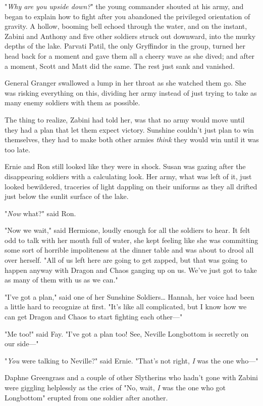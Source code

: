 "\emph{Why are you upside down?}" the young commander shouted at his army, and 
began to explain how to fight after you abandoned the privileged orientation of 
gravity.
\sbreak
A hollow, booming bell echoed through the water, and on the instant, Zabini and 
Anthony and five other soldiers struck out downward, into the murky depths of 
the lake. Parvati Patil, the only Gryffindor in the group, turned her head back 
for a moment and gave them all a cheery wave as she dived; and after a moment, 
Scott and Matt did the same. The rest just sank and vanished.

General Granger swallowed a lump in her throat as she watched them go. She was 
risking everything on this, dividing her army instead of just trying to take as 
many enemy soldiers with them as possible.

The thing to realize, Zabini had told her, was that no army would move until 
they had a plan that let them expect victory. Sunshine couldn't just plan to 
win themselves, they had to make both other armies \emph{think} they would win 
until it was too late.

Ernie and Ron still looked like they were in shock. Susan was gazing after the 
disappearing soldiers with a calculating look. Her army, what was left of it, 
just looked bewildered, traceries of light dappling on their uniforms as they 
all drifted just below the sunlit surface of the lake.

"\emph{Now} what?" said Ron.

"Now we wait," said Hermione, loudly enough for all the soldiers to hear. It 
felt odd to talk with her mouth full of water, she kept feeling like she was 
committing some sort of horrible impoliteness at the dinner table and was about 
to drool all over herself. "All of us left here are going to get zapped, but 
that was going to happen anyway with Dragon and Chaos ganging up on us. We've 
just got to take as many of them with us as we can."

"I've got a plan," said one of her Sunshine Soldiers{\ldots} Hannah, her voice 
had been a little hard to recognize at first. "It's like all complicated, but I 
know how we can get Dragon and Chaos to start fighting each other---"

"Me too!" said Fay. "I've got a plan too! See, Neville Longbottom is secretly 
on our side---"

"\emph{You} were talking to Neville?" said Ernie. "That's not right, \emph{I} 
was the one who---"

Daphne Greengrass and a couple of other Slytherins who hadn't gone with Zabini 
were giggling helplessly as the cries of "No, wait, \emph{I} was the one who 
got Longbottom" erupted from one soldier after another.

